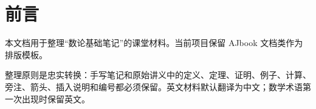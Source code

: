 \chapter*{前言}

本文档用于整理“数论基础笔记”的课堂材料。当前项目保留 AJbook 文档类作为排版模板。

整理原则是忠实转换：手写笔记和原始讲义中的定义、定理、证明、例子、计算、旁注、箭头、插入说明和编号都必须保留。英文材料默认翻译为中文；数学术语第一次出现时保留英文。
